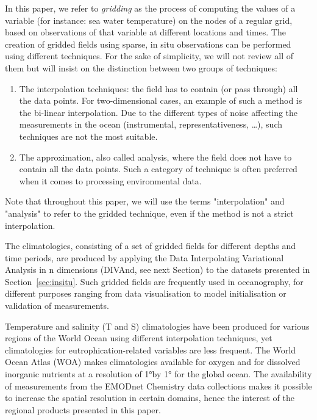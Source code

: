 \documentclass[essd, manuscript]{copernicus}
\begin{document}
In this paper, we refer to \textit{gridding} as the process of computing the values of a variable (for instance: sea water temperature) on the nodes of a regular grid, based on observations of that variable at different locations and times. The creation of gridded fields using sparse, in situ observations can be performed using different techniques. For the sake of simplicity, we will not review all of them but will insist on the distinction between two groups of techniques:
\begin{enumerate}
\item The interpolation techniques: the field has to contain (or pass through) all the data points. For two-dimensional cases, an example of such a method is the bi-linear interpolation. Due to the different types of noise affecting the measurements in the ocean (instrumental, representativeness, \ldots), such techniques are not the most suitable.
\item The approximation, also called analysis, where the field does not have to contain all the data points. Such a category of technique is often preferred when it comes to processing environmental data.
\end{enumerate}

Note that throughout this paper, we will use the terms "interpolation" and "analysis" to refer to the gridded technique, even if the method is not a strict interpolation.

The climatologies, consisting of a set of gridded fields for different depths and time periods, are produced by applying the Data Interpolating Variational Analysis in n dimensions (DIVAnd, see next Section) to the datasets presented in Section~\ref{sec:insitu}. Such gridded fields are frequently used in oceanography, for different purposes ranging from data visualisation to model initialisation or validation of measurements.  

Temperature and salinity (T and S) climatologies have been produced for various regions of the World Ocean using different interpolation techniques, yet climatologies for eutrophication-related variables are less frequent. The World Ocean Atlas (WOA) makes climatologies available for oxygen \citep[Dissolved Oxygen, Apparent Oxygen Utilization, and Oxygen Saturation,][]{Garcia2024} and for dissolved inorganic nutrients \citep[phosphate, nitrate and nitrate + nitrite, silicate,][]{Garcia2024b} at a resolution of 1°by 1° for the global ocean. The availability of measurements from the EMODnet Chemistry data collections makes it possible to increase the spatial resolution in certain domains, hence the interest of the regional products presented in this paper.
\end{document}
